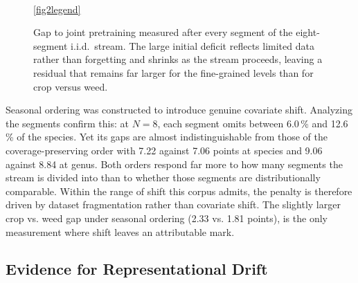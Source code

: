 \documentclass[english]{lni}
\begin{document}
\begin{figure}[tb]
\centering
{}\\
\ref{fig2legend}
\caption{Gap to joint pretraining measured after every segment of the eight-segment i.i.d.\ stream. The large initial deficit reflects limited data rather than forgetting and shrinks as the stream proceeds, leaving a residual that remains far larger for the fine-grained levels than for crop versus weed.}
\label{fig:gap-trajectory}
\end{figure}

Seasonal ordering was constructed to introduce genuine covariate shift. Analyzing the segments confirm this: at $N=8$, each segment omits between 6.0\,\% and 12.6\,\% of the species. Yet its gaps are almost indistinguishable from those of the coverage-preserving order with 7.22 against 7.06 points at species and 9.06 against 8.84 at genus. Both orders respond far more to how many segments the stream is divided into than to whether those segments are distributionally comparable. Within the range of shift this corpus admits, the penalty is therefore driven by dataset fragmentation rather than covariate shift. The slightly larger crop vs. weed gap under seasonal ordering (2.33 vs. 1.81 points), is the only measurement where shift leaves an attributable mark.

\subsection{Evidence for Representational Drift}\label{sec:drift}
\end{document}
